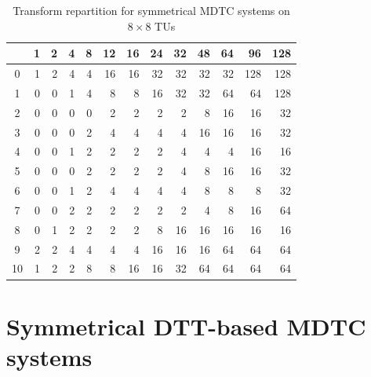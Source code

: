 \documentclass[11pt,a4paper,openright,twoside]{book}
\numberwithin{equation}{section} %
\numberwithin{figure}{section} %
\numberwithin{table}{section} %
\begin{document}
\begin{table}[h]
	\centering
	\small
	\def\arraystretch{0.85}
	\begin{tabular}{c|rrrrrrrrrrrr}
		\diagbox{\acs{IPM}}{System} &
		1 & 2 & 4 & 8  & 12 & 16 & 24 & 32 & 48 & 64 & 96 & 128 \\
		\hline
		0  & 1 & 2 & 4 & 4 & 16 & 16 & 32 & 32 & 32 & 32 & 128 & 128 \\
		1  & 0 & 0 & 1 & 4 & 8  & 8  & 16 & 32 & 32 & 64 & 64  & 128 \\
		2  & 0 & 0 & 0 & 0 & 2  & 2  & 2  & 2  & 8  & 16 & 16  & 32 \\
		3  & 0 & 0 & 0 & 2 & 4  & 4  & 4  & 4  & 16 & 16 & 16  & 32 \\
		4  & 0 & 0 & 1 & 2 & 2  & 2  & 2  & 4  & 4  & 4  & 16  & 16 \\
		5  & 0 & 0 & 0 & 2 & 2  & 2  & 2  & 4  & 8  & 16 & 16  & 32 \\
		6  & 0 & 0 & 1 & 2 & 4  & 4  & 4  & 4  & 8  & 8  & 8   & 32 \\
		7  & 0 & 0 & 2 & 2 & 2  & 2  & 2  & 2  & 4  & 8  & 16  & 64 \\
		8  & 0 & 1 & 2 & 2 & 2  & 2  & 8  & 16 & 16 & 16 & 16  & 16 \\
		9  & 2 & 2 & 4 & 4 & 4  & 4  & 16 & 16 & 16 & 64 & 64  & 64 \\
		10 & 1 & 2 & 2 & 8 & 8  & 16 & 16 & 32 & 64 & 64 & 64  & 64 \\
	\end{tabular}
	\caption{Transform repartition for symmetrical \acs{MDTC} systems on
	$8\times8$ \acsp{TU}}
	\label{tab:config_sym_mdtc_8}
\end{table}

\section*{Symmetrical \acs{DTT}-based \acs{MDTC} systems}
\label{sec:symmetrical_dtt_based_mdtc_systems}
\end{document}
